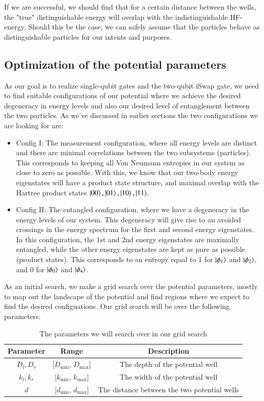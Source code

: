 \documentclass{subfiles}
\begin{document}
If we are successful, we should find that for a certain distance between the wells, the "true" distinguishable energy will overlap with the indistinguishable HF-energy. Should this be the case, we can safely assume that the particles behave as distinguishable particles for our intents and purposes. 

\subsection{Optimization of the potential parameters}\label{sec:optimization_procedure}
As our goal is to realize single-qubit gates and the two-qubit iSwap gate, we need to find suitable configurations of our potential where we achieve the desired degeneracy in energy levels and also our desired level of entanglement between the two particles. As we've discussed in earlier sections the two configurations we are looking for are:
\begin{itemize}
    \item Config I: The measurement configuration, where all energy levels are distinct and there are minimal correlations between the two subsystems (particles). This corresponds to keeping all Von Neumann entropies in our system as close to zero as possible. With this, we know that our two-body energy eigenstates will have a product state structure, and maximal overlap with the Hartree product states $\ket{00}, \ket{01}, \ket{10}, \ket{11}$.
    \item Config II: The entangled configuration, where we have a degeneracy in the energy levels of our system. This degeneracy will give rise to an avoided crossings in the energy spectrum for the first and second energy eigenstates. In this configuration, the 1st and 2nd energy eigenstates are maximally entangled, while the other energy eigenstates are kept as pure as possible (product states). This corresponds to an entropy equal to 1 for $\ket{\phi_1}$ and $\ket{\phi_2}$, and 0 for $\ket{\phi_0}$ and $\ket{\phi_4}$. 
\end{itemize}
As an initial search, we make a grid search over the potential parameters, mostly to map out the landscape of the potential and find regions where we expect to find the desired configuations. Our grid search will be over the following parameters:
\begin{table}
    \centering
    \begin{tabular}{|c|c|c|}
        \hline
        Parameter & Range & Description \\
        \hline
        $D_l, D_r$ & [$D_{\text{min}}$, $D_{\text{max}}$] & The depth of the potential well \\
        $k_l, k_r$ & [$k_{\text{min}}$, $k_{\text{max}}$] & The width of the potential well \\
        $d$ & [$d_{\text{min}}$, $d_{\text{max}}$] & The distance between the two potential wells \\
        \hline
    \end{tabular}
    \caption{The parameters we will search over in our grid search}
\end{table}
\end{document}
